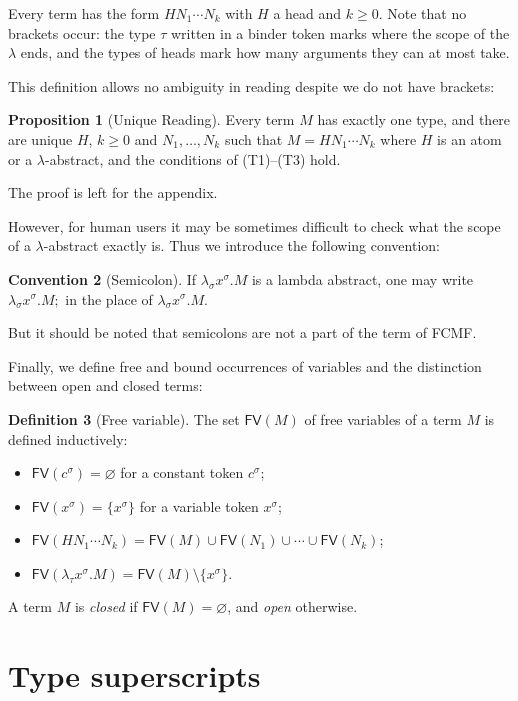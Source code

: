 \documentclass[11pt,a4paper]{article}
\theoremstyle{definition}
\newtheorem{definition}{Definition}[section]
\newtheorem{convention}[definition]{Convention}
\newtheorem{proposition}[definition]{Proposition}
\theoremstyle{plain}
\newcommand{\FV}{\mathsf{FV}}
\begin{document}
Every term has the form $HN_1\cdots N_k$ with $H$ a head and $k\ge0$. Note that no brackets occur: the type $\tau$ written in a binder token marks where the scope of the $\lambda$ ends, and the types of heads mark how many arguments they can at most take. 

This definition allows no ambiguity in reading despite we do not have brackets:

\begin{proposition}[Unique Reading]\label{prop:unique}
  Every term $M$ has exactly one type, and there are unique
$H$, $k\ge0$ and $N_1,\dots,N_k$ such that
$M=HN_1\cdots N_k$ where $H$ is an atom or a $\lambda$-abstract,
and the conditions of (T1)--(T3) hold. 
\end{proposition}
The proof is left for the appendix.

However, for human users it may be sometimes difficult to check what the scope of a $\lambda$-abstract exactly is. Thus we introduce the following convention:

\begin{convention}[Semicolon]
  If $\lambda_\sigma x^\sigma. M$ is a lambda abstract, one may write $\lambda_\sigma x^\sigma. M;$ in the place of $\lambda_\sigma x^\sigma. M$.
\end{convention}

But it should be noted that semicolons are not a part of the term of FCMF.

Finally, we define free and bound occurrences of variables and the distinction between open and closed terms:

\begin{definition}[Free variable]
The set $\FV(M)$ of free variables of a term $M$ is defined inductively:
\begin{itemize}[itemsep=0pt]
  \item $\FV(c^\sigma)=\varnothing$ for a constant token $c^\sigma$;
  \item $\FV(x^\sigma)=\{x^\sigma\}$ for a variable token $x^\sigma$;
  \item $\FV(HN_1\cdots N_k)=\FV(M)\cup\FV(N_1)\cup\cdots\cup\FV(N_k)$;
  \item $\FV(\lambda_\tau x^\sigma. M)=\FV(M)\setminus\{x^\sigma\}$.
\end{itemize}
A term $M$ is \emph{closed} if $\FV(M)=\varnothing$, and \emph{open} otherwise.
\end{definition}


\section{Type superscripts}\label{sec:super}
\end{document}
